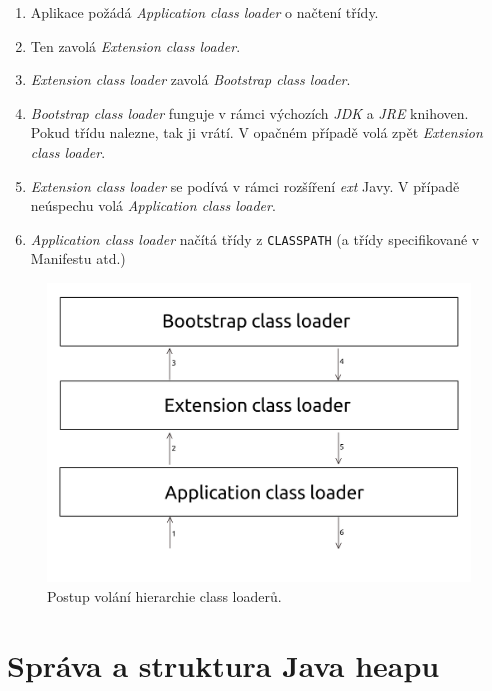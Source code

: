 \begin{enumerate}
	\item Aplikace požádá \textit{Application class loader} o načtení třídy.
	\item Ten zavolá \textit{Extension class loader}.
	\item \textit{Extension class loader} zavolá \textit{Bootstrap class loader}.
	\item \textit{Bootstrap class loader} funguje v rámci výchozích \textit{JDK} a \textit{JRE} knihoven. Pokud třídu nalezne, tak ji vrátí. V opačném případě volá zpět \textit{Extension class loader}.
	\item \textit{Extension class loader} se podívá v rámci rozšíření \textit{ext} Javy. V případě neúspechu volá \textit{Application class loader}.
	\item \textit{Application class loader} načítá třídy z \texttt{CLASSPATH} (a třídy specifikované v Manifestu atd.)
\end{enumerate}

\begin{figure}[h]
	\centering
	\includegraphics[scale=0.5]{obrazky/class-loader.png}
	\caption{Postup volání hierarchie class loaderů.}
	\label{obr-class-loader}
\end{figure}




\chapter{Správa a struktura Java heapu}
\label{memory-management}

